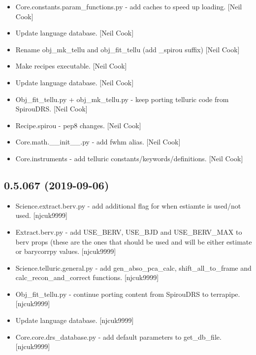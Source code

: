 \documentclass[a4paper,10pt,english]{report}
\begin{document}
\begin{itemize}
\item {} 
Core.constants.param\_functions.py - add caches to speed up loading.
{[}Neil Cook{]}

\item {} 
Update language database. {[}Neil Cook{]}

\item {} 
Rename obj\_mk\_tellu and obj\_fit\_tellu (add \_spirou suffix) {[}Neil Cook{]}

\item {} 
Make recipes executable. {[}Neil Cook{]}

\item {} 
Update language database. {[}Neil Cook{]}

\item {} 
Obj\_fit\_tellu.py + obj\_mk\_tellu.py - keep porting telluric code from
SpirouDRS. {[}Neil Cook{]}

\item {} 
Recipe.spirou - pep8 changes. {[}Neil Cook{]}

\item {} 
Core.math.\_\_init\_\_.py - add fwhm alias. {[}Neil Cook{]}

\item {} 
Core.instruments - add telluric constants/keywords/definitions. {[}Neil
Cook{]}

\end{itemize}


\subsection{0.5.067 (2019-09-06)}
\label{\detokenize{misc/changelog:id74}}\begin{itemize}
\item {} 
Science.extract.berv.py - add additional flag for when estiamte is
used/not used. {[}njcuk9999{]}

\item {} 
Extract.berv.py - add USE\_BERV, USE\_BJD and USE\_BERV\_MAX to berv props
(these are the ones that should be used and will be either estimate or
barycorrpy values. {[}njcuk9999{]}

\item {} 
Science.telluric.general.py - add gen\_abso\_pca\_calc,
shift\_all\_to\_frame and calc\_recon\_and\_correct functions. {[}njcuk9999{]}

\item {} 
Obj\_fit\_tellu.py - continue porting content from SpirouDRS to
terrapipe. {[}njcuk9999{]}

\item {} 
Update language database. {[}njcuk9999{]}

\item {} 
Core.core.drs\_database.py - add default parameters to get\_db\_file.
{[}njcuk9999{]}

\end{itemize}
\end{document}
